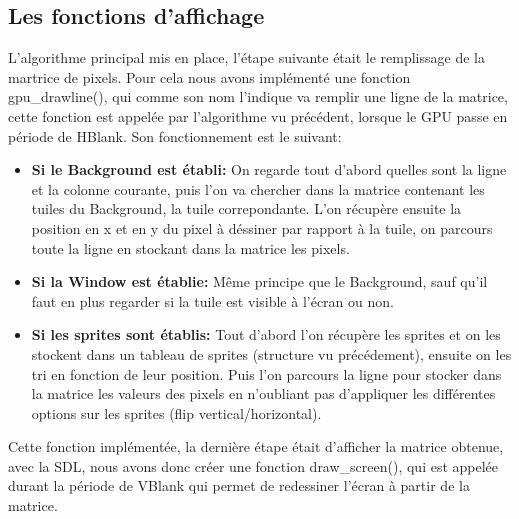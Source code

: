 \documentclass{report}
\begin{document}
\subsection{Les fonctions d'affichage}
L'algorithme principal mis en place, l'étape suivante était le remplissage de la martrice de pixels. Pour cela nous avons implémenté une fonction gpu\_drawline(), qui comme son nom l'indique va remplir une ligne de la matrice, cette fonction est appelée par l'algorithme vu précédent, lorsque le GPU passe en période de HBlank. Son fonctionnement est le suivant:\\
\begin{itemize}
\item \textbf{Si le Background est établi:}
	On regarde tout d'abord quelles sont la ligne et la colonne courante, puis l'on va chercher dans la matrice contenant les tuiles du Background, la tuile correpondante. L'on récupère ensuite la position en x et en y du pixel à déssiner par rapport à la tuile, on parcours toute la ligne en stockant dans la matrice les pixels.\\
\item \textbf{Si la Window est établie:}
	Même principe que le Background, sauf qu'il faut en plus regarder si la tuile est visible à l'écran ou non.\\
\item \textbf{Si les sprites sont établis:}
	Tout d'abord l'on récupère les sprites et on les stockent dans un tableau de sprites (structure vu précédement), ensuite on les tri en fonction de leur position. Puis l'on parcours la ligne pour stocker dans la matrice les valeurs des pixels en n'oubliant pas d'appliquer les différentes options sur les sprites (flip vertical/horizontal).\\
\end{itemize}

Cette fonction implémentée, la dernière étape était d'afficher la matrice obtenue, avec la SDL, nous avons donc créer une fonction draw\_screen(), qui est appelée durant la période de VBlank qui permet de redessiner l'écran à partir de la matrice.\\
\end{document}
